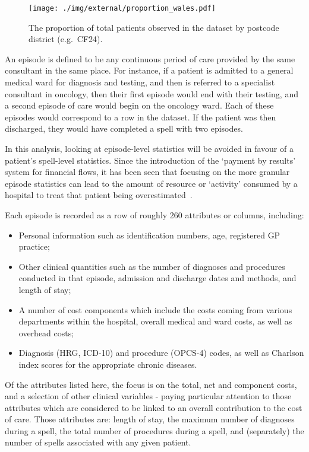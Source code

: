 \begin{figure}[htbp]
    \centering
    \texttt{[image: ./img/external/proportion\_wales.pdf]}
    \caption{The proportion of total patients observed in the dataset by
    postcode district (e.g.\ CF24).}\label{fig:proportion_wales}
\end{figure}

An episode is defined to be any continuous period of care provided
by the same consultant in the same place. For instance, if a patient is admitted
to a general medical ward for diagnosis and testing, and then is referred to a
specialist consultant in oncology, then their first episode would end with their
testing, and a second episode of care would begin on the oncology ward. Each of
these episodes would correspond to a row in the dataset. If the patient was then
discharged, they would have completed a spell with two episodes.

In this analysis, looking at episode-level statistics will be avoided in favour
of a patient's spell-level statistics. Since the introduction of the `payment by
results' system for financial flows, it has been seen that focusing on the more
granular episode statistics can lead to the amount of resource or `activity'
consumed by a hospital to treat that patient being overestimated~\cite{BMJ2004}.

Each episode is recorded as a row of roughly 260 attributes or columns,
including:

\begin{itemize}
    \item Personal information such as identification numbers, age, registered
        GP practice;
    \item Other clinical quantities such as the number of diagnoses and
        procedures conducted in that episode, admission and discharge dates and
        methods, and length of stay;
    \item A number of cost components which include the costs coming from
        various departments within the hospital, overall medical and ward costs,
        as well as overhead costs;
    \item Diagnosis (HRG, ICD-10) and procedure (OPCS-4) codes, as well as
        Charlson index scores for the appropriate chronic diseases.
\end{itemize}

Of the attributes listed here, the focus is on the total, net and component
costs, and a selection of other clinical variables \-- paying particular
attention to those attributes which are considered to be linked to an overall
contribution to the cost of care. Those attributes are: length of stay, the
maximum number of diagnoses during a spell, the total number of procedures
during a spell, and (separately) the number of spells associated with any given
patient.

